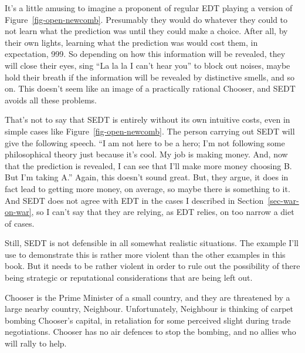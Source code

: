 \documentclass[
  12pt,
  letterpaper,
  DIV=11,
  numbers=noendperiod]{scrreprt}
\begin{document}
It's a little amusing to imagine a proponent of regular EDT playing a
version of Figure~\ref{fig-open-newcomb}. Presumably they would do
whatever they could to not learn what the prediction was until they
could make a choice. After all, by their own lights, learning what the
prediction was would cost them, in expectation, 999. So depending on how
this information will be revealed, they will close their eyes, sing ``La
la la I can't hear you'' to block out noises, maybe hold their breath if
the information will be revealed by distinctive smells, and so on. This
doesn't seem like an image of a practically rational Chooser, and SEDT
avoids all these problems.

That's not to say that SEDT is entirely without its own intuitive costs,
even in simple cases like Figure~\ref{fig-open-newcomb}. The person
carrying out SEDT will give the following speech. ``I am not here to be
a hero; I'm not following some philosophical theory just because it's
cool. My job is making money. And, now that the prediction is revealed,
I can see that I'll make more money choosing B. But I'm taking A.''
Again, this doesn't sound great. But, they argue, it does in fact lead
to getting more money, on average, so maybe there is something to it.
And SEDT does not agree with EDT in the cases I described in
Section~\ref{sec-war-on-war}, so I can't say that they are relying, as
EDT relies, on too narrow a diet of cases.

Still, SEDT is not defensible in all somewhat realistic situations. The
example I'll use to demonstrate this is rather more violent than the
other examples in this book. But it needs to be rather violent in order
to rule out the possibility of there being strategic or reputational
considerations that are being left out.

Chooser is the Prime Minister of a small country, and they are
threatened by a large nearby country, Neighbour. Unfortunately,
Neighbour is thinking of carpet bombing Chooser's capital, in
retaliation for some perceived slight during trade negotiations. Chooser
has no air defences to stop the bombing, and no allies who will rally to
help.
\end{document}
